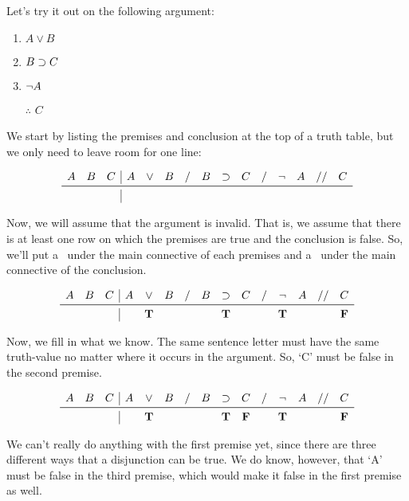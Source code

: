 \documentclass[../logic-text.tex]{subfiles}
\begin{document}
Let's try it out on the following argument:

\begin{enumerate}
	\item \(A \lor B\)
  \item \(B \supset C \)
	\item \underline{\(\neg A\)}
	\item [$\therefore$] \(C\)
\end{enumerate}


We start by listing the premises and conclusion at the top of a truth table, but we only need to leave room for one line:

\[
\begin{array}{ccc|cccccccccccc}
  A&B&C& A & \lor & B & / & B & \lif & C & / & \lneg & A & // & C \\ \midrule
  &&&&&&&&&&&&&& \\
\end{array}
\]

Now, we will assume that the argument is invalid. That is, we assume that there is at least one row on which the premises are true and the conclusion is false. So, we'll put a \true\ under the main connective of each premises and a \false\ under the main connective of the conclusion.

\[
\begin{array}{ccc|cccccccccccc}
  A&B&C& A & \lor & B & / & B & \lif & C & / & \lneg & A & // & C \\ \midrule
  &&&& \true &&&& \true &&& \true &&& \false \\
\end{array}
\]

Now, we fill in what we know. The same sentence letter must have the same truth-value no matter where it occurs in the argument. So, \enquote*{C} must be false in the second premise.

\[
\begin{array}{ccc|cccccccccccc}
  A&B&C& A & \lor & B & / & B & \lif & C & / & \lneg & A & // & C \\ \midrule
  &&&& \true &&&& \true & \false && \true &&& \false \\
\end{array}
\]

We can't really do anything with the first premise yet, since there are three different ways that a disjunction can be true. We do know, however, that \enquote*{A} must be false in the third premise, which would make it false in the first premise as well.
\end{document}
